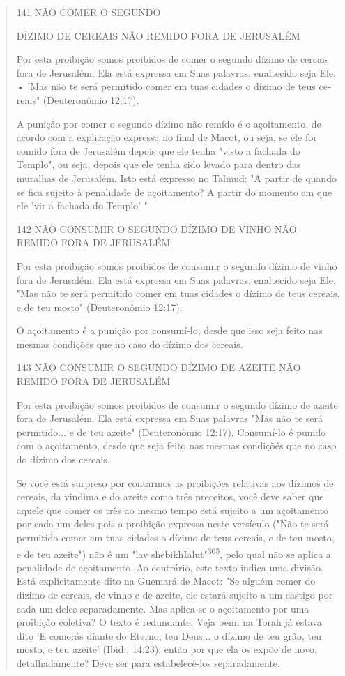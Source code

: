 \begin{quote}
141 NÃO COMER O SEGUNDO

DÍZIMO DE CEREAIS NÃO REMIDO FORA DE JERUSALÉM

Por esta proibição somos proibidos de comer o segundo dízimo de cercais
fora de Jerusalém. Ela está expressa em Suas palavras, enaltecido seja
Ele, • 'Mas não te será permitido comer em tuas cidades o dízimo de teus
ce­reais" (Deuteronômio 12:17).

A punição por comer o segundo dízimo não remido é o açoitamento, de
acordo com a explicação expressa no final de Macot, ou seja, se ele for
comi­do fora de Jerusalém depois que ele tenha "visto a fachada do
Templo", ou seja, depois que ele tenha sido levado para dentro das
muralhas de Jerusalém. Isto está expresso no Talmud: "A partir de quando
se fica sujeito à penalidade de açoitamento? A partir do momento em que
ele 'vir a fachada do Templo' "

142 NÃO CONSUMIR O SEGUNDO DÍZIMO DE VINHO NÃO REMIDO FORA DE JERUSALÉM

Por esta proibição somos proibidos de consumir o segundo dízimo de vinho
fora de Jerusalém. Ela está expressa em Suas palavras, enaltecido seja
Ele, "Mas não te será permitido comer em tuas cidades o dízimo de teus
ce­reais, e de teu mosto" (Deuteronômio 12:17).

O açoitamento é a punição por consumí-lo, desde que isso seja feito nas
mesmas condições que no caso do dízimo dos cereais.

143 NÃO CONSUMIR O SEGUNDO DÍZIMO DE AZEITE NÃO REMIDO FORA DE JERUSALÉM

Por esta proibição somos proibidos de consumir o segundo dízimo de
azeite fora de Jerusalém. Ela está expressa em Suas palavras "Mas não te
será permitido... e de teu azeite" (Deuteronômio 12:17). Consumí-lo é
punido com o açoitamento, desde que seja feito nas mesmas condiçõés que
no caso do dízi­mo dos cereais.

Se você está surpreso por contarmos as proibições relativas aos dízi­mos
de cereais, da vindima e do azeite como três preceitos, você deve saber
que aquele que comer os três ao mesmo tempo está sujeito a um
açoitamento por cada um deles pois a proibição expressa neste versículo
("Não te será permi­tido comer em tuas cidades o dízimo de teus cereais,
e de teu mosto, e de teu azeite") não é um "lav
shebikhIalut"\textsuperscript{305}, pelo qual não se aplica a penalidade
de açoitamento. Ao contrário, este texto indica uma divisão. Está
explicitamente dito na Guemará de Macot: "Se alguém comer do dízimo de
cereais, de vinho e de azeite, ele estará sujeito a um castigo por cada
um deles separadamente. Mas aplica-se o açoitamento por uma proibição
coletiva? O texto é redundante. Veja bem: na Torah já estava dito 'E
comerás diante do Eterno, teu Deus... o dízimo de teu grão, teu mosto, e
teu azeite' (Ibid., 14:23); então por que ela os expõe de novo,
detalhadamente? Deve ser para estabelecê-los separadamente.


\end{quote}
